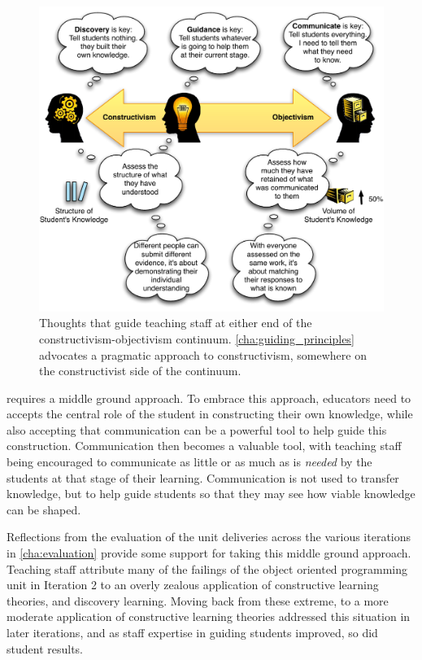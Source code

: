 \begin{figure}[htbp]
	\centering
	\includegraphics[width=\textwidth]{BalanceConstructivism}
	\caption{Thoughts that guide teaching staff at either end of the constructivism-objectivism continuum. \cref{cha:guiding_principles} advocates a pragmatic approach to constructivism, somewhere on the constructivist side of the continuum. }
	\label{fig:balanced_constructivism}
\end{figure}

 requires a middle ground approach. To embrace this approach, educators need to accepts the central role of the student in constructing their own knowledge, while also accepting that communication can be a powerful tool to help guide this construction. Communication then becomes a valuable tool, with teaching staff being encouraged to communicate as little or as much as is \emph{needed} by the students at that stage of their learning. Communication is not used to transfer knowledge, but to help guide students so that they may see how viable knowledge can be shaped.

Reflections from the evaluation of the unit deliveries across the various iterations in \cref{cha:evaluation} provide some support for taking this middle ground approach. Teaching staff attribute many of the failings of the object oriented programming unit in Iteration 2 to an overly zealous application of constructive learning theories, and discovery learning. Moving back from these extreme, to a more moderate application of constructive learning theories addressed this situation in later iterations, and as staff expertise in guiding students improved, so did student results.

